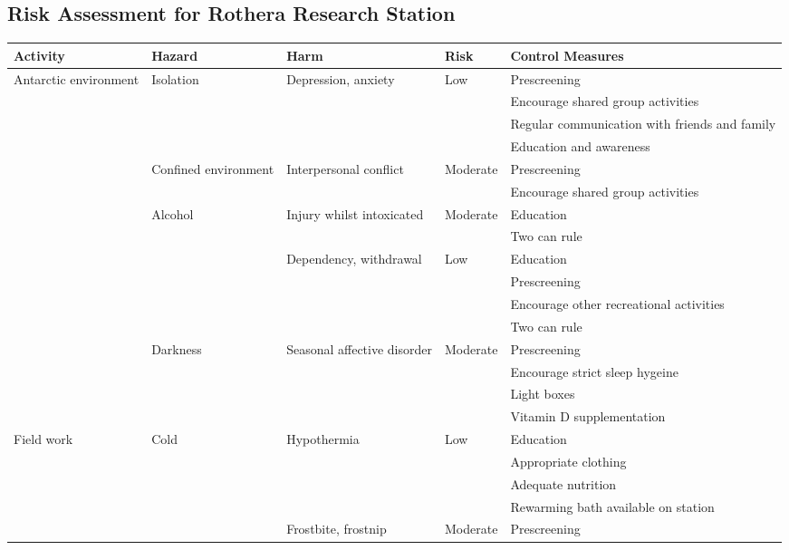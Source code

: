 \documentclass[12pt,a4paper]{article}
\begin{document}
\appendix
\begin{landscape}
    \section{Risk Assessment for Rothera Research Station}
    \begin{longtabu} to\linewidth{X[l]X[l]X[l]X[l]X[2,l]}
        \toprule
        \rowfont\bfseries Activity & Hazard & Harm & Risk & Control Measures \\
        \midrule
        \endhead
        Antarctic environment & Isolation & Depression, anxiety & Low & Prescreening \\
         &  &  &  & Encourage shared group activities \\
         &  &  &  & Regular communication with friends and family \\
         &  &  &  & Education and awareness \\
         & Confined environment & Interpersonal conflict & Moderate & Prescreening \\
         &  &  &  & Encourage shared group activities \\
         & Alcohol & Injury whilst intoxicated & Moderate & Education \\
         &  &  &  & Two can rule \\
         &  & Dependency, withdrawal & Low & Education \\
         &  &  &  & Prescreening \\
         &  &  &  & Encourage other recreational activities \\
         &  &  &  & Two can rule \\
         & Darkness & Seasonal affective disorder & Moderate & Prescreening \\
         &  &  &  & Encourage strict sleep hygeine \\
         &  &  &  & Light boxes \\
         &  &  &  & Vitamin D supplementation \\
        \midrule
        Field work & Cold & Hypothermia & Low & Education \\
         &  &  &  & Appropriate clothing \\
         &  &  &  & Adequate nutrition \\
         &  &  &  & Rewarming bath available on station \\
         &  & Frostbite, frostnip & Moderate & Prescreening \\

\end{longtabu}
\end{landscape}
\end{document}
